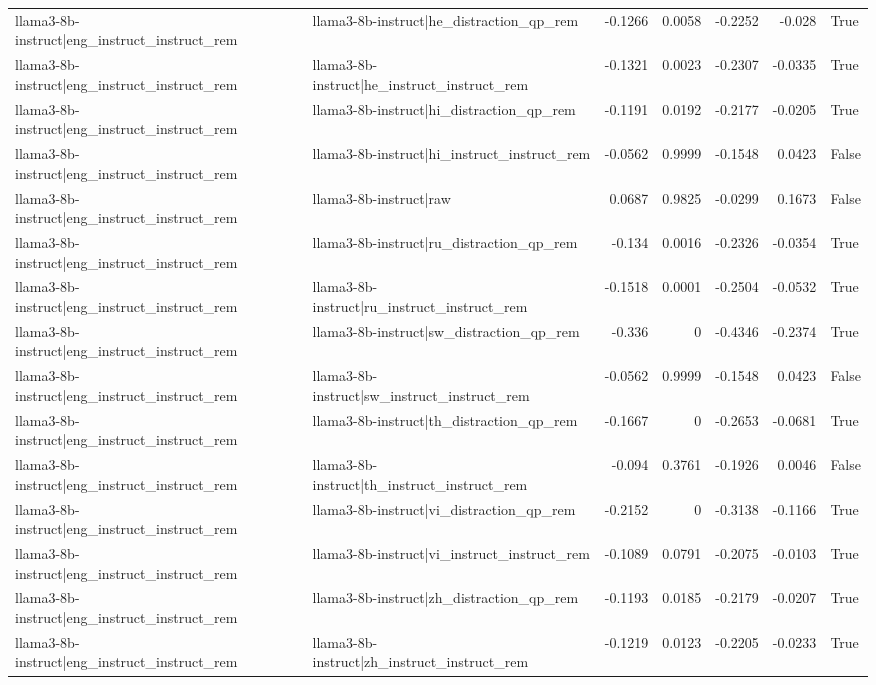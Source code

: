 \begin{table}
\begin{tabular}{l l r r r r l}
llama3-8b-instruct|eng_instruct_instruct_rem & llama3-8b-instruct|he_distraction_qp_rem & -0.1266 & 0.0058 & -0.2252 & -0.028 & True \\
llama3-8b-instruct|eng_instruct_instruct_rem & llama3-8b-instruct|he_instruct_instruct_rem & -0.1321 & 0.0023 & -0.2307 & -0.0335 & True \\
llama3-8b-instruct|eng_instruct_instruct_rem & llama3-8b-instruct|hi_distraction_qp_rem & -0.1191 & 0.0192 & -0.2177 & -0.0205 & True \\
llama3-8b-instruct|eng_instruct_instruct_rem & llama3-8b-instruct|hi_instruct_instruct_rem & -0.0562 & 0.9999 & -0.1548 & 0.0423 & False \\
llama3-8b-instruct|eng_instruct_instruct_rem & llama3-8b-instruct|raw & 0.0687 & 0.9825 & -0.0299 & 0.1673 & False \\
llama3-8b-instruct|eng_instruct_instruct_rem & llama3-8b-instruct|ru_distraction_qp_rem & -0.134 & 0.0016 & -0.2326 & -0.0354 & True \\
llama3-8b-instruct|eng_instruct_instruct_rem & llama3-8b-instruct|ru_instruct_instruct_rem & -0.1518 & 0.0001 & -0.2504 & -0.0532 & True \\
llama3-8b-instruct|eng_instruct_instruct_rem & llama3-8b-instruct|sw_distraction_qp_rem & -0.336 & 0 & -0.4346 & -0.2374 & True \\
llama3-8b-instruct|eng_instruct_instruct_rem & llama3-8b-instruct|sw_instruct_instruct_rem & -0.0562 & 0.9999 & -0.1548 & 0.0423 & False \\
llama3-8b-instruct|eng_instruct_instruct_rem & llama3-8b-instruct|th_distraction_qp_rem & -0.1667 & 0 & -0.2653 & -0.0681 & True \\
llama3-8b-instruct|eng_instruct_instruct_rem & llama3-8b-instruct|th_instruct_instruct_rem & -0.094 & 0.3761 & -0.1926 & 0.0046 & False \\
llama3-8b-instruct|eng_instruct_instruct_rem & llama3-8b-instruct|vi_distraction_qp_rem & -0.2152 & 0 & -0.3138 & -0.1166 & True \\
llama3-8b-instruct|eng_instruct_instruct_rem & llama3-8b-instruct|vi_instruct_instruct_rem & -0.1089 & 0.0791 & -0.2075 & -0.0103 & True \\
llama3-8b-instruct|eng_instruct_instruct_rem & llama3-8b-instruct|zh_distraction_qp_rem & -0.1193 & 0.0185 & -0.2179 & -0.0207 & True \\
llama3-8b-instruct|eng_instruct_instruct_rem & llama3-8b-instruct|zh_instruct_instruct_rem & -0.1219 & 0.0123 & -0.2205 & -0.0233 & True \\

\end{tabular}
\end{table}
